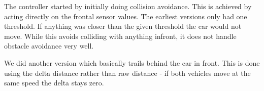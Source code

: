 The controller started by initially doing collision avoidance.
This is achieved by acting directly on the frontal sensor values.
The earliest versions only had one threshold. If anything was closer than the given threshold the car would not move.
While this avoids colliding with anything infront, it does not handle obstacle avoidance very well.



We did another version which basically trails behind the car in front.
This is done using the delta distance rather than raw distance - if both vehicles move at the same speed the delta stays zero.
